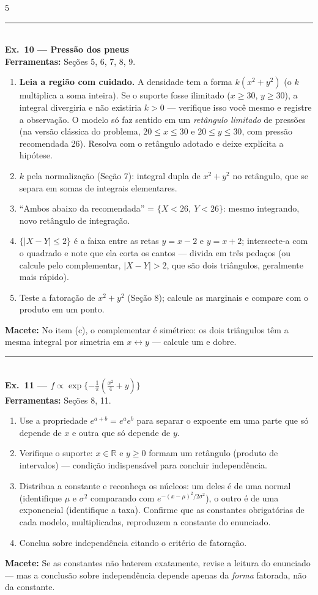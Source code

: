 \documentclass[a4paper,8pt]{extarticle}
\newcommand{\tit}[1]{\vspace{2pt}\textcolor{azul}{\rule{\linewidth}{0.6pt}}\\[1pt]\textbf{\textcolor{azul}{#1}}\\[1pt]}
\newcommand{\mac}[1]{\textcolor{verde}{\textbf{Macete:}} #1\par}
\newcommand{\ferr}[1]{\textbf{Ferramentas:} #1\par}
\newcommand{\Rr}{\mathbb{R}}
\begin{document}
\begin{multicols*}{5}
\tit{Ex.\ 10 — Pressão dos pneus}
\ferr{Seções 5, 6, 7, 8, 9.}
\begin{enumerate}
\item[0.] \textbf{Leia a região com cuidado.} A densidade tem a forma $k(x^2+y^2)$ (o $k$ multiplica a soma inteira). Se o suporte fosse ilimitado ($x\ge30$, $y\ge30$), a integral divergiria e não existiria $k>0$ — verifique isso você mesmo e registre a observação. O modelo só faz sentido em um \emph{retângulo limitado} de pressões (na versão clássica do problema, $20\le x\le30$ e $20\le y\le30$, com pressão recomendada 26). Resolva com o retângulo adotado e deixe explícita a hipótese.
\item[(a)] $k$ pela normalização (Seção 7): integral dupla de $x^2+y^2$ no retângulo, que se separa em somas de integrais elementares.
\item[(b)] “Ambos abaixo da recomendada” = $\{X<26,\ Y<26\}$: mesmo integrando, novo retângulo de integração.
\item[(c)] $\{|X-Y|\le2\}$ é a faixa entre as retas $y=x-2$ e $y=x+2$; intersecte-a com o quadrado e note que ela corta os cantos — divida em três pedaços (ou calcule pelo complementar, $|X-Y|>2$, que são dois triângulos, geralmente mais rápido).
\item[(d)] Teste a fatoração de $x^2+y^2$ (Seção 8); calcule as marginais e compare com o produto em um ponto.
\end{enumerate}
\mac{No item (c), o complementar é simétrico: os dois triângulos têm a mesma integral por simetria em $x\leftrightarrow y$ — calcule um e dobre.}

\tit{Ex.\ 11 — $f\propto \exp\{-\frac{1}{\pi}(\frac{x^2}{4}+y)\}$}
\ferr{Seções 8, 11.}
\begin{enumerate}
\item Use a propriedade $e^{a+b}=e^{a}e^{b}$ para separar o expoente em uma parte que só depende de $x$ e outra que só depende de $y$.
\item Verifique o suporte: $x\in\Rr$ e $y\ge0$ formam um retângulo (produto de intervalos) — condição indispensável para concluir independência.
\item Distribua a constante e reconheça os núcleos: um deles é de uma normal (identifique $\mu$ e $\sigma^2$ comparando com $e^{-(x-\mu)^2/2\sigma^2}$), o outro é de uma exponencial (identifique a taxa). Confirme que as constantes obrigatórias de cada modelo, multiplicadas, reproduzem a constante do enunciado.
\item Conclua sobre independência citando o critério de fatoração.
\end{enumerate}
\mac{Se as constantes não baterem exatamente, revise a leitura do enunciado — mas a conclusão sobre independência depende apenas da \emph{forma} fatorada, não da constante.}


\end{multicols*}
\end{document}
